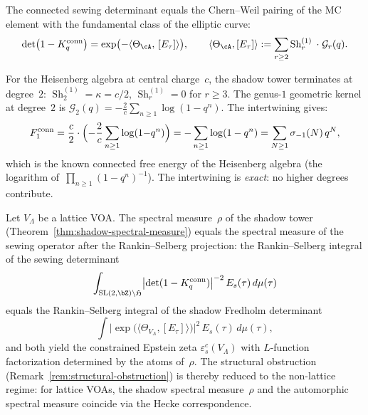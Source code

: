 \begin{corollary}
\label{cor:shadow-fredholm}
\ClaimStatusProvedElsewhere
The connected sewing determinant equals the Chern--Weil pairing
of the MC element with the fundamental class of the elliptic
curve:
\begin{equation}\label{eq:shadow-fredholm}
 \det\bigl(1 - K_q^{\mathrm{conn}}\bigr)
 = \exp\bigl(-\langle\Theta_\cA,\,[E_\tau]\rangle\bigr),
 \qquad
 \langle\Theta_\cA,[E_\tau]\rangle
 := \sum_{r\ge2}
 \operatorname{Sh}_r^{(1)}\;\cdot\;\mathcal{G}_r(q).
\end{equation}
\end{corollary}

\begin{example}
\label{ex:heisenberg-intertwining}
For the Heisenberg algebra at central charge~$c$, the shadow tower
terminates at degree~$2$:
$\operatorname{Sh}_2^{(1)} = \kappa = c/2$,
$\operatorname{Sh}_r^{(1)} = 0$ for $r \ge 3$.
The genus-$1$ geometric kernel at degree~$2$ is
$\mathcal{G}_2(q) = -\tfrac{2}{c}\sum_{n\ge1}\log(1-q^n)$.
The intertwining gives:
\[
 F_1^{\mathrm{conn}}
 = \frac{c}{2} \cdot \Bigl(-\frac{2}{c}\sum_{n\ge1}
 \log(1{-}q^n)\Bigr)
 = -\sum_{n\ge1}\log(1-q^n)
 = \sum_{N\ge1} \sigma_{-1}(N)\,q^N,
\]
which is the known connected free energy of the Heisenberg algebra
(the logarithm of~$\prod_{n\ge1}(1-q^n)^{-1}$).
The intertwining is \emph{exact}: no higher degrees contribute.
\end{example}

\begin{corollary}
\label{cor:spectral-measure-identification}
\ClaimStatusConditional
Let $V_\Lambda$ be a lattice VOA. The spectral measure~$\rho$
of the shadow tower
\textup{(}Theorem~\textup{\ref{thm:shadow-spectral-measure}}\textup{)}
equals the spectral measure of the sewing operator after the
Rankin--Selberg projection: the Rankin--Selberg integral of the
sewing determinant
\[
 \int_{\mathrm{SL}(2,\bZ)\backslash\mathfrak{H}}
 \bigl\lvert
 \det(1 - K_q^{\mathrm{conn}})
 \bigr\rvert^{-2}\,
 E_s(\tau)\,d\mu(\tau)
\]
equals the Rankin--Selberg integral of the shadow Fredholm
determinant
\[
 \int
 \bigl\lvert
 \exp\bigl(\langle\Theta_{V_\Lambda},[E_\tau]\rangle\bigr)
 \bigr\rvert^2\,
 E_s(\tau)\,d\mu(\tau),
\]
and both yield the constrained Epstein zeta
$\varepsilon^c_s(V_\Lambda)$ with $L$-function factorization
determined by the atoms of~$\rho$. The structural obstruction
\textup{(}Remark~\textup{\ref{rem:structural-obstruction}}\textup{)}
is thereby reduced to the non-lattice regime: for lattice VOAs,
the shadow spectral measure~$\rho$ and the automorphic spectral
measure coincide via the Hecke correspondence.
\end{corollary}

